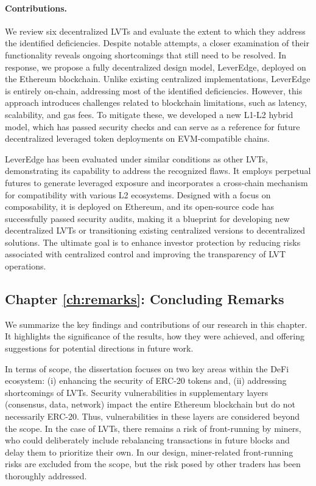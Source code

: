 \paragraph{Contributions.} We review six decentralized LVTs and evaluate the extent to which they address the identified deficiencies. Despite notable attempts, a closer examination of their functionality reveals ongoing shortcomings that still need to be resolved. In response, we propose a fully decentralized design model, LeverEdge, deployed on the Ethereum blockchain. Unlike existing centralized implementations, LeverEdge is entirely on-chain, addressing most of the identified deficiencies. However, this approach introduces challenges related to blockchain limitations, such as latency, scalability, and gas fees. To mitigate these, we developed a new L1-L2 hybrid model, which has passed security checks and can serve as a reference for future decentralized leveraged token deployments on EVM-compatible chains. 

LeverEdge has been evaluated under similar conditions as other LVTs, demonstrating its capability to address the recognized flaws. It employs perpetual futures to generate leveraged exposure and incorporates a cross-chain mechanism for compatibility with various L2 ecosystems. Designed with a focus on composability, it is deployed on Ethereum, and its open-source code has successfully passed security audits, making it a blueprint for developing new decentralized LVTs or transitioning existing centralized versions to decentralized solutions. The ultimate goal is to enhance investor protection by reducing risks associated with centralized control and improving the transparency of LVT operations.

\subsection{Chapter \ref{ch:remarks}: Concluding Remarks}
We summarize the key findings and contributions of our research in this chapter. It highlights the significance of the results, how they were achieved, and offering suggestions for potential directions in future work.

In terms of scope, the dissertation focuses on two key areas within the DeFi ecosystem: (i) enhancing the security of ERC-20 tokens and, (ii) addressing shortcomings of LVTs. Security vulnerabilities in supplementary layers (\eg consensus, data, network) impact the entire Ethereum blockchain but do not necessarily ERC-20. Thus, vulnerabilities in these layers are considered beyond the scope. In the case of LVTs, there remains a risk of front-running by miners, who could deliberately include rebalancing transactions in future blocks and delay them to prioritize their own. In our design, miner-related front-running risks are excluded from the scope, but the risk posed by other traders has been thoroughly addressed.